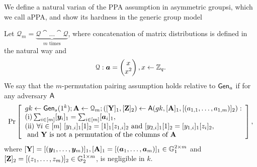 We define a natural varian of the PPA assumption in asymmetric groupsi, which we call aPPA, and show its hardness in the generic group model

%
\begin{definition}
Let $\mathcal{Q}_{m}=\underbrace{\mathcal{Q}\cat\ldots\cat\mathcal{Q}}_{m\text{ times}}$, where concatenation of matrix distributions is defined in the natural way and 
$$\mathcal{Q}: {\boldsymbol{a}}=\left(\begin{matrix}x\\x^2\end{matrix}\right), x\gets\mathbb{Z}_q.$$
We say that the $m$-permutation pairing assumption holds relative to $\mathsf{Gen}_a$ if for any adversary $\mathsf{A}$
$$
\Pr\left[
\begin{array}{l}
	gk\gets\mathsf{Gen}_s(1^k);\mathbf{{A}}\gets\mathcal{Q}_{m};([\mathbf{{Y}}]_1,[\mathbf{{Z}}]_2)\gets\mathsf{A}(gk,[\mathbf{{A}}]_1,[(a_{1,1},\ldots,a_{1,m})]_2):\\
	\mathrm{(i)} \sum_{i\in[m]}[{\boldsymbol{y}}_i]_1 = \sum_{i\in[m]}[{\boldsymbol{a}}_i]_1,\\
	\mathrm{(ii)}\ \forall i\in[m]\ [y_{1,i}]_1[1]_2=[1]_1[z_{1,i}]_2 \text{ and } [y_{2,i}]_1[1]_2=[y_{1,i}]_1[z_{i}]_2,\\
	\text{ and }\mathbf{{Y}}\text{ is not a permutation of the columns of }\mathbf{{A}}
\end{array}
\right],
$$
where $[\mathbf{{Y}}]=[({\boldsymbol{y}}_1,\ldots,{\boldsymbol{y}}_m)]_1, [\mathbf{{A}}]_1=[({\boldsymbol{a}}_1,\ldots,{\boldsymbol{a}}_m)]_1\in\mathbb{G}_1^{2\times m}$ and $[\mathbf{{Z}}]_2=\allowbreak [(z_1,\ldots,\allowbreak z_m)]_2\in\mathbb{G}_2^{1\times m}$, is negligible in $k$.
\end{definition}

